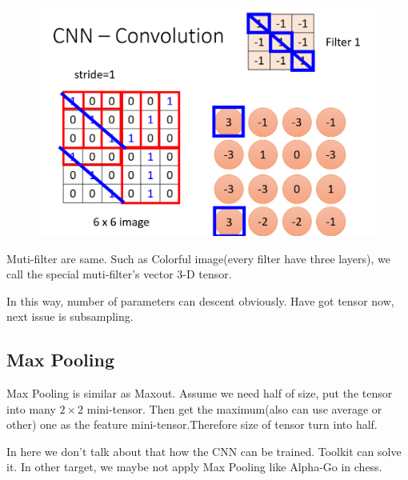 \documentclass{article}
\begin{document}
\begin{figure}[htbp]
  \centering
  \includegraphics[scale=0.5]{pic/Property 2.png}
  \label{fig:my_label}
\end{figure}

Muti-filter are same. Such as Colorful image(every filter have three layers), we call the special muti-filter's vector 3-D tensor.

In this way, number of parameters can descent obviously. Have got tensor now, next issue is subsampling.

\subsection{Max Pooling}

Max Pooling is similar as Maxout. Assume we need half of size, put the tensor into many $2\times 2$ mini-tensor. Then get the maximum(also can use average or other) one as the feature mini-tensor.Therefore size of tensor turn into half.

In here we don't talk about that how the CNN can be trained. Toolkit can solve it. In other target, we maybe not apply Max Pooling like Alpha-Go in chess.
\end{document}
